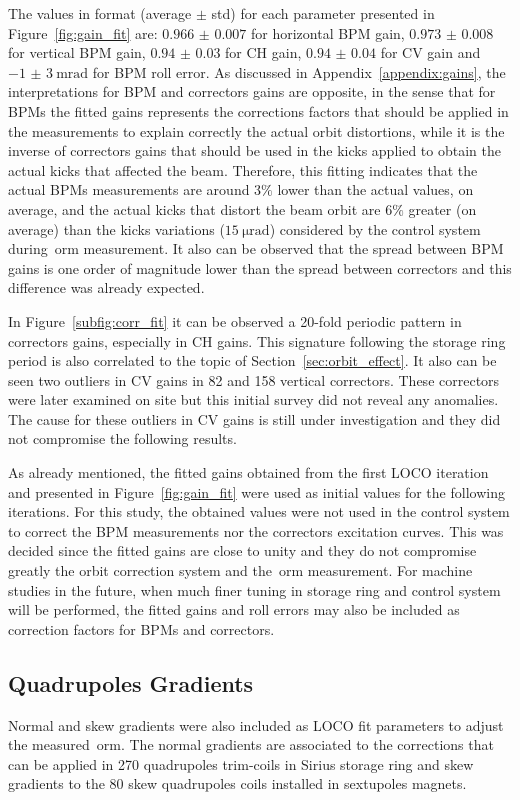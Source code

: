 The values in format (average $\pm$ std) for each parameter presented in Figure~\ref{fig:gain_fit} are: $\num{0.966(7)}$ for horizontal BPM gain, $\num{0.973(8)}$ for vertical BPM gain, $\num{0.94(3)}$ for CH gain, $\num{0.94(4)}$ for CV gain and $\SI{-1(3)}{\milli\radian}$ for BPM roll error. As discussed in Appendix~\ref{appendix:gains}, the interpretations for BPM and correctors gains are opposite, in the sense that for BPMs the fitted gains represents the corrections factors that should be applied in the measurements to explain correctly the actual orbit distortions, while it is the inverse of correctors gains that should be used in the kicks applied to obtain the actual kicks that affected the beam. Therefore, this fitting indicates that the actual BPMs measurements are around $3\%$ lower than the actual values, on average, and the actual kicks that distort the beam orbit are $6\%$ greater (on average) than the kicks variations ($\SI{15}{\micro\radian}$) considered by the control system during~\gls{orm} measurement. It also can be observed that the spread between BPM gains is one order of magnitude lower than the spread between correctors and this difference was already expected.

In Figure~\ref{subfig:corr_fit} it can be observed a 20-fold periodic pattern in correctors gains, especially in CH gains. This signature following the storage ring period is also correlated to the topic of Section~\ref{sec:orbit_effect}. It also can be seen two outliers in CV gains in 82 and 158 vertical correctors. These correctors were later examined on site but this initial survey did not reveal any anomalies. The cause for these outliers in CV gains is still under investigation and they did not compromise the following results.

As already mentioned, the fitted gains obtained from the first LOCO iteration and presented in Figure~\ref{fig:gain_fit} were used as initial values for the following iterations. For this study, the obtained values were not used in the control system to correct the BPM measurements nor the correctors excitation curves. This was decided since the fitted gains are close to unity and they do not compromise greatly the orbit correction system and the~\gls{orm} measurement. For machine studies in the future, when much finer tuning in storage ring and control system will be performed, the fitted gains and roll errors may also be included as correction factors for BPMs and correctors.

\subsection{Quadrupoles Gradients}
Normal and skew gradients were also included as LOCO fit parameters to adjust the measured~\gls{orm}. The normal gradients are associated to the corrections that can be applied in 270 quadrupoles trim-coils in Sirius storage ring and skew gradients to the 80 skew quadrupoles coils installed in sextupoles magnets.

